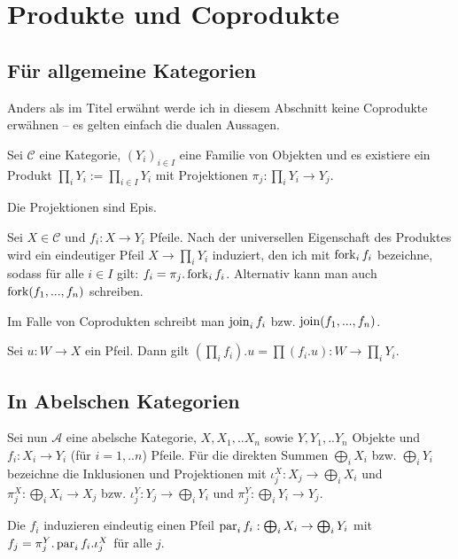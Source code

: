 \section{Produkte und Coprodukte}

\subsection{Für allgemeine Kategorien}

Anders als im Titel erwähnt werde ich in diesem Abschnitt keine Coprodukte erwähnen -- es gelten einfach die dualen Aussagen.

Sei $\mathcal C$ eine Kategorie, $(Y_i)_{i\in I}$ eine Familie von Objekten und es existiere ein Produkt $\prod_i Y_i := \prod_{i\in I} Y_i$ mit Projektionen $\pi_j : \prod_i Y_i \to Y_j$.

\begin{prop} Die Projektionen sind Epis.
\end{prop}

Sei $X\in \mathcal C$ und $f_i : X \to Y_i$ Pfeile. Nach der universellen Eigenschaft des Produktes wird ein eindeutiger Pfeil $X \to \prod_i Y_i$ induziert, den ich mit $\operatorname{fork}_i f_i$ bezeichne, sodass für alle $i\in I$ gilt: $f_i = \pi_j . \operatorname{fork}_i f_i$. Alternativ kann man auch $\operatorname{fork}(f_1,...,f_n)$ schreiben.

Im Falle von Coprodukten schreibt man $\operatorname{join}_i f_i$ bzw. $\operatorname{join}(f_1,...,f_n)$.

\begin{prop} Sei $u : W \to X$ ein Pfeil. Dann gilt $(\prod_i f_i) . u = \prod (f_i . u): W \to \prod_i Y_i$.
\end{prop}


\subsection{In Abelschen Kategorien}

Sei nun $\mathcal A$ eine abelsche Kategorie, $X,X_1,..X_n$ sowie $Y,Y_1,..Y_n$ Objekte und $f_i : X_i \to Y_i$ (für $i = 1,..n$) Pfeile.
Für die direkten Summen $\bigoplus_i X_i$ bzw. $\bigoplus_i Y_i$ bezeichne die Inklusionen und Projektionen mit $\iota^X_j : X_j \to \bigoplus_i X_i$ und $\pi^X_j : \bigoplus_i X_i \to X_j$ bzw. $\iota^Y_j : Y_j \to \bigoplus_i Y_i$ und $\pi^Y_j : \bigoplus_i Y_i \to Y_j$.

\begin{prop} Die $f_i$ induzieren eindeutig einen Pfeil $\operatorname{par}_i f_i : \bigoplus_i X_i \to \bigoplus_i Y_i$ mit $f_j = \pi^Y_j . \operatorname{par}_i f_i . \iota^X_j$ für alle $j$.
\end{prop}

